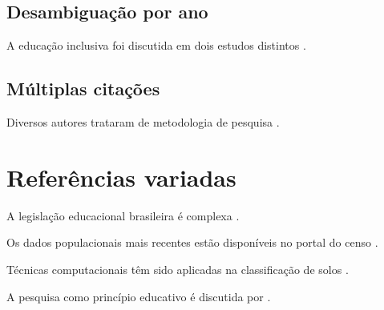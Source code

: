 \documentclass[a4paper, 12pt]{report}
\begin{document}
\section{Desambiguação por ano}

A educação inclusiva foi discutida em dois estudos distintos
\parencite{santos2020a,santos2020b}.

\section{Múltiplas citações}

Diversos autores trataram de metodologia de pesquisa
\parencite{severino2007,demo2003,silva2015}.

\chapter{Referências variadas}

A legislação educacional brasileira é complexa \parencite{brasil2014}.

Os dados populacionais mais recentes estão disponíveis no portal do censo
\parencite{ibge2023}.

Técnicas computacionais têm sido aplicadas na classificação de solos
\parencite{oliveira2018}.

A pesquisa como princípio educativo é discutida por \textcite{demo2003}.

\imprimirreferencias
\end{document}
